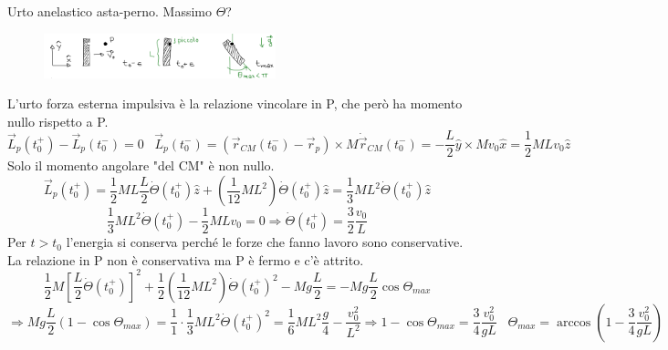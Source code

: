 \begin{example}
    Urto anelastico asta-perno. Massimo $\Theta$?
    \begin{figure}[h!]
        \centering
        \includegraphics[width=0.6\textwidth]{images/urto-anaelastico-asta-perno.png}
    \end{figure}

    \hspace{-15pt}L'urto forza esterna impulsiva è la relazione vincolare in P, che però ha momento nullo rispetto a P.
    $$\vec{L}_p(t_0^+) - \vec{L}_p(t_0^-) = 0 \hspace{10pt}\vec{L}_p(t_0^-) = (\vec{r}_{CM}(t_0^-) - \vec{r}_p) \times M\dot{\vec{r}}_{CM}(t_0^-) = -\frac{L}{2}\hat{y} \times Mv_0 \hat{x} = \frac{1}{2}MLv_0\hat{z}$$
    Solo il momento angolare "del CM" è non nullo.
    $$\vec{L}_p(t_0^+) = \frac{1}{2}ML \frac{L}{2}\dot{\Theta}(t_0^+)\hat{z} + (\frac{1}{12}ML^2)\dot{\Theta}(t_0^+)\hat{z} = \frac{1}{3}ML^2 \dot{\Theta}(t_0^+)\hat{z}$$
    $$\frac{1}{3}ML^2\dot{\Theta}(t_0^+) - \frac{1}{2}MLv_0 = 0 \Rightarrow \dot{\Theta}(t_0^+) = \frac{3}{2}\frac{v_0}{L}$$
    Per $t > t_0$ l'energia si conserva perché le forze che fanno lavoro sono conservative. La relazione in P non è conservativa ma P è fermo e c'è attrito.
    $$\frac{1}{2}M[\frac{L}{2}\dot{\Theta}(t_0^+)]^2 + \frac{1}{2}(\frac{1}{12}ML^2)\dot{\Theta}(t_0^+)^2 - Mg\frac{L}{2} = -Mg \frac{L}{2}\cos\Theta_{max}$$
    $$\Rightarrow Mg \frac{L}{2}(1 - \cos\Theta_{max}) = \frac{1}{1}\cdot \frac{1}{3}ML^2\dot{\Theta}(t_0^+)^2 = \frac{1}{6}ML^2 \frac{g}{4} - \frac{v_0^2}{L^2} \Rightarrow 1 - \cos\Theta_{max} = \frac{3}{4}\frac{v_0^2}{gL} \hspace{10pt}\Theta_{max} = \arccos(1-\frac{3}{4}\frac{v_0^2}{gL})$$
\end{example}